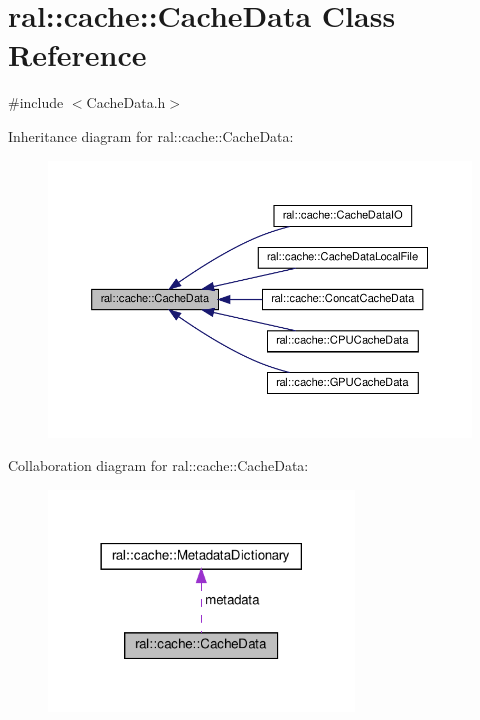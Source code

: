 \hypertarget{classral_1_1cache_1_1CacheData}{}\section{ral\+:\+:cache\+:\+:Cache\+Data Class Reference}
\label{classral_1_1cache_1_1CacheData}


{\ttfamily \#include $<$Cache\+Data.\+h$>$}



Inheritance diagram for ral\+:\+:cache\+:\+:Cache\+Data\+:\nopagebreak
\begin{figure}[H]
\begin{center}
\leavevmode
\includegraphics[width=350pt]{classral_1_1cache_1_1CacheData__inherit__graph}
\end{center}
\end{figure}


Collaboration diagram for ral\+:\+:cache\+:\+:Cache\+Data\+:\nopagebreak
\begin{figure}[H]
\begin{center}
\leavevmode
\includegraphics[width=230pt]{classral_1_1cache_1_1CacheData__coll__graph}
\end{center}
\end{figure}
